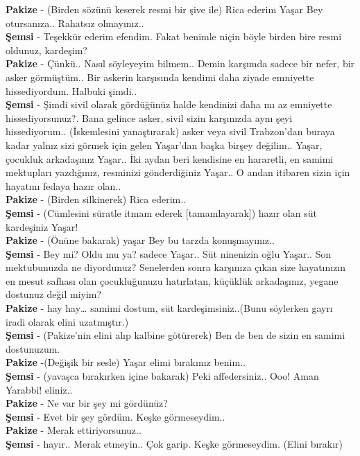 \documentclass[]{book}
\begin{document}
\textbf{Pakize} - (Birden sözünü keserek resmi bir şive ile) Rica ederim Yaşar Bey otursanıza.. Rahatsız olmayınız..\\
\textbf{Şemsi} - Teşekkür ederim efendim. Fakat benimle niçin böyle birden bire resmi oldunuz, kardeşim?\\
\textbf{Pakize} - Çünkü.. Nasıl söyleyeyim bilmem.. Demin karşımda sadece bir nefer, bir asker görmüştüm.. Bir askerin karşısında kendimi daha ziyade emniyette hissediyordum. Halbuki şimdi..\\
\textbf{Şemsi} - Şimdi sivil olarak gördüğünüz halde kendinizi daha mı az emniyette hissediyorsunuz?. Bana gelince asker, sivil sizin karşınızda aynı şeyi hissediyorum.. (İskemlesini yanaştırarak) asker veya sivil Trabzon'dan buraya kadar yalnız sizi görmek için gelen Yaşar'dan başka birşey değilim.. Yaşar, çocukluk arkadaşınız Yaşar.. İki aydan beri kendisine en hararetli, en samimi mektupları yazdığınız, resminizi gönderdiğiniz Yaşar.. O andan itibaren sizin için hayatını fedaya hazır olan..\\
\textbf{Pakize} - (Birden silkinerek) Rica ederim..\\
\textbf{Şemsi} - (Cümlesini süratle itmam ederek {[}tamamlayarak{]}) hazır olan süt kardeşiniz Yaşar!\\
\textbf{Pakize} - (Önüne bakarak) yaşar Bey bu tarzda konuşmayınız..\\
\textbf{Şemsi} - Bey mi? Oldu mu ya? sadece Yaşar.. Süt ninenizin oğlu Yaşar.. Son mektubunuzda ne diyordunuz? Senelerden sonra karşınıza çıkan size hayatınızın en mesut safhası olan çocukluğunuzu hatırlatan, küçüklük arkadaşınız, yegane dostunuz değil miyim?\\
\textbf{Pakize} - hay hay\ldots{} samimi dostum, süt kardeşimsiniz..(Bunu söylerken gayrı iradi olarak elini uzatmıştır.)\\
\textbf{Şemsi} - (Pakize'nin elini alıp kalbine götürerek) Ben de ben de sizin en samimi dostunuzum.\\
\textbf{Pakize} -(Değişik bir sesle) Yaşar elimi bırakınız benim..\\
\textbf{Şemsi} - (yavaşca bırakırken içine bakarak) Peki affedersiniz.. Ooo! Aman Yarabbi! eliniz..\\
\textbf{Pakize} - Ne var bir şey mi gördünüz?\\
\textbf{Şemsi} - Evet bir şey gördüm. Keşke görmeseydim..\\
\textbf{Pakize} - Merak ettiriyorsunuz..\\
\textbf{Şemsi} - hayır.. Merak etmeyin.. Çok garip. Keşke görmeseydim. (Elini bırakır)\\
\end{document}

